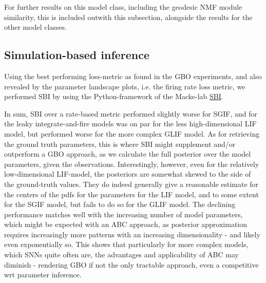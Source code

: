 \documentclass[mphil,deptreport,ianc]{infthesis} %
\begin{document}
For further results on this model class, including the geodesic NMF module similarity, this is included outwith this subsection, alongside the results for the other model classes.



\subsection{Simulation-based inference}

Using the best performing loss-metric as found in the GBO experiments, and also revealed by the parameter landscape plots, i.e. the firing rate loss metric, we performed SBI by using the Python-framework of the Macke-lab \href{https://github.com/mackelab/sbi}{SBI}.

In sum, SBI over a rate-based metric performed slightly worse for SGIF, and for the leaky integrate-and-fire models was on par for the less high-dimensional LIF model, but performed worse for the more complex GLIF model.
As for retrieving the ground truth parameters, this is where SBI might supplement and/or outperform a GBO approach, as we calculate the full posterior over the model parameters, given the observations.
Interestingly, however, even for the relatively low-dimensional LIF-model, the posteriors are somewhat skewed to the side of the ground-truth values. They do indeed generally give a reasonable estimate for the centers of the pdfs for the parameters for the LIF model, and to some extent for the SGIF model, but fails to do so for the GLIF model.
The declining performance matches well with the increasing number of model parameters, which might be expected with an ABC approach, as posterior approximation requires increasingly more patterns with an increasing dimensionality - and likely even exponentially so.
This shows that particularly for more complex models, which SNNs quite often are, the advantages and applicability of ABC may diminish - rendering GBO if not the only tractable approach, even a competitive wrt parameter inference.
\end{document}
